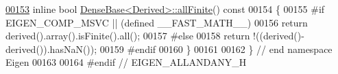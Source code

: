 \begin{DoxyCode}
\hyperlink{group___core___module_af1e669fd3aaae50a4870dc1b8f3b8884}{00153} \textcolor{keyword}{inline} \textcolor{keywordtype}{bool} \hyperlink{group___core___module_af1e669fd3aaae50a4870dc1b8f3b8884}{DenseBase<Derived>::allFinite}()\textcolor{keyword}{ const}
00154 \textcolor{keyword}{}\{
00155 \textcolor{preprocessor}{#if EIGEN\_COMP\_MSVC || (defined \_\_FAST\_MATH\_\_)}
00156   \textcolor{keywordflow}{return} derived().array().isFinite().all();
00157 \textcolor{preprocessor}{#else}
00158   \textcolor{keywordflow}{return} !((derived()-derived()).hasNaN());
00159 \textcolor{preprocessor}{#endif}
00160 \}
00161     
00162 \} \textcolor{comment}{// end namespace Eigen}
00163 
00164 \textcolor{preprocessor}{#endif // EIGEN\_ALLANDANY\_H}
\end{DoxyCode}
